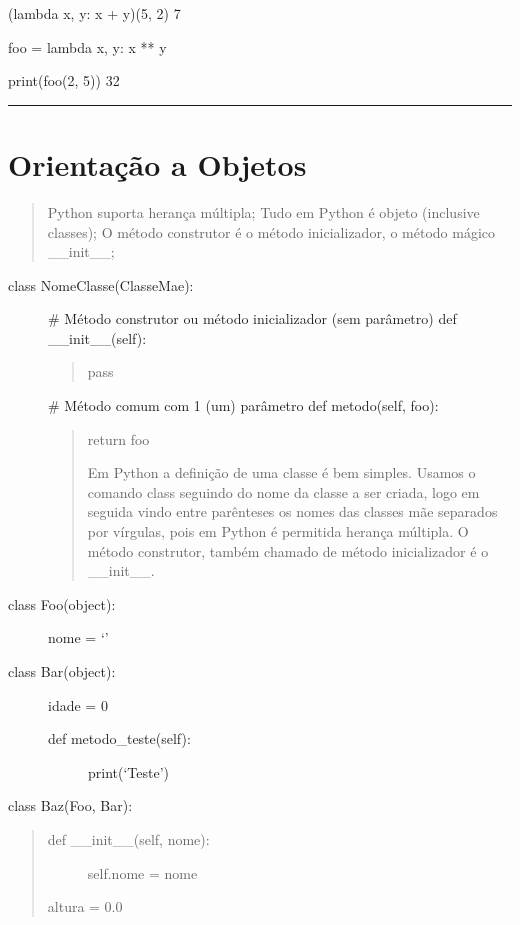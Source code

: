 \documentclass[letterpaper,10pt,brazil]{sphinxmanual}
\begin{document}
(lambda x, y: x + y)(5, 2)
7

foo = lambda x, y: x ** y

print(foo(2, 5))
32


\bigskip\hrule\bigskip



\chapter{Orientação a Objetos}
\label{\detokenize{content/oo:orientacao-a-objetos}}\label{\detokenize{content/oo::doc}}\begin{quote}

Python suporta herança múltipla;
Tudo em Python é objeto (inclusive classes);
O método construtor é o método inicializador, o método mágico \_\_init\_\_;
\end{quote}
\begin{description}
\item[{class NomeClasse(ClasseMae):}] \leavevmode
\# Método construtor ou método inicializador (sem parâmetro)
def \_\_init\_\_(self):
\begin{quote}

pass
\end{quote}

\# Método comum com 1 (um) parâmetro
def metodo(self, foo):
\begin{quote}

return foo

Em Python a definição de uma classe é bem simples. Usamos o comando class seguindo do nome da classe a ser criada, logo em seguida vindo entre parênteses os nomes das classes mãe separados por vírgulas, pois em Python é permitida herança múltipla.
O método construtor, também chamado de método inicializador é o \_\_init\_\_.
\end{quote}

\item[{class Foo(object):}] \leavevmode
nome = ‘’

\item[{class Bar(object):}] \leavevmode
idade = 0
\begin{description}
\item[{def metodo\_teste(self):}] \leavevmode
print(‘Teste’)

\end{description}

\end{description}

class Baz(Foo, Bar):
\begin{quote}
\begin{description}
\item[{def \_\_init\_\_(self, nome):}] \leavevmode
self.nome = nome

\end{description}

altura = 0.0
\end{quote}
\end{document}
